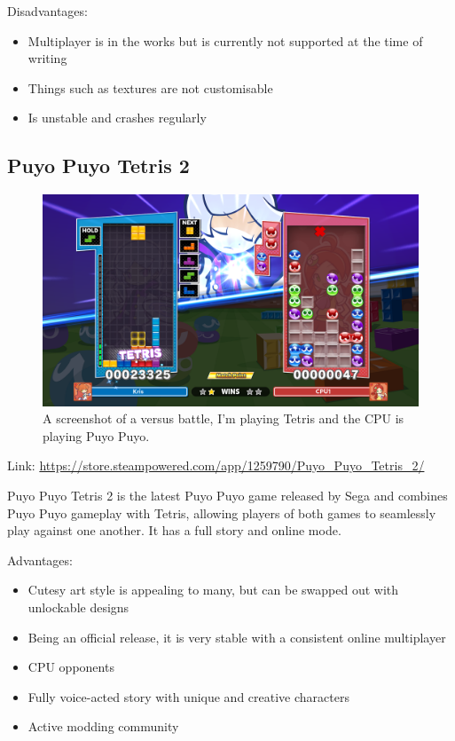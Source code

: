 \documentclass{report}
\begin{document}
\vspace{0.7cm}

Disadvantages: 

\begin{itemize}
    \renewcommand\labelitemi{--}
    \item Multiplayer is in the works but is currently not supported at the time of writing
    \item Things such as textures are not customisable
    \item Is unstable and crashes regularly
\end{itemize}

\subsection{Puyo Puyo Tetris 2}

\begin{figure}[ht]
\centering
\includegraphics[width=1\textwidth]{ppt2.png}
\caption{\label{fig:ppt2}A screenshot of a versus battle, I'm playing Tetris and the CPU is playing Puyo Puyo.}
\end{figure}
Link: \href{https://store.steampowered.com/app/1259790/Puyo_Puyo_Tetris_2/}{https://store.steampowered.com/app/1259790/Puyo\_Puyo\_Tetris\_2/}

Puyo Puyo Tetris 2 is the latest Puyo Puyo game released by Sega and combines Puyo Puyo gameplay with Tetris, allowing players of both games to seamlessly play against one another. It has a full story and online mode.
\vspace{1cm}

Advantages:

\begin{itemize}
    \renewcommand\labelitemi{--}
    \item Cutesy art style is appealing to many, but can be swapped out with unlockable designs
    \item Being an official release, it is very stable with a consistent online multiplayer
    \item CPU opponents
    \item Fully voice-acted story with unique and creative characters
    \item Active modding community
\end{itemize}
\end{document}
